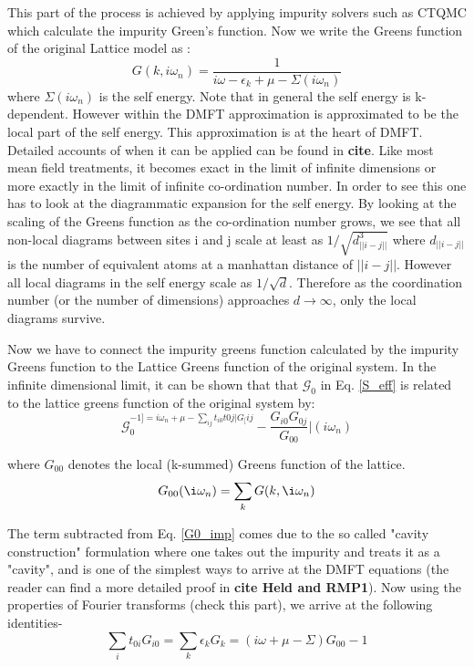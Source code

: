 \documentclass[12pt,letter]{article}
\begin{document}
This part of the process is achieved by applying impurity solvers such as CTQMC which calculate the impurity Green's function. Now we write the Greens function of the original Lattice model as :
\begin{equation}
G(k,i\omega_n)=\dfrac{1}{i\omega -\epsilon_k +\mu -\Sigma(i\omega_n)}
\end{equation}
 where $\Sigma(i\omega_n)$ is the self energy. Note that in general the self energy is k-dependent. However within the DMFT approximation is approximated to be the local part of the self energy. This approximation is at the heart of DMFT. Detailed accounts of when it can be applied can be found in \textbf{cite}. Like most mean field treatments, it becomes exact in the limit of infinite dimensions or more exactly in the limit of infinite co-ordination number. In order to see this one has to look at the diagrammatic expansion for the self energy. By looking at the scaling of the Greens function as the co-ordination number grows, we see that all non-local diagrams between sites i and j scale at least as $1/\sqrt{d_{||i-j||}^3}$ where $d_{||i-j||}$ is the number of equivalent atoms at a manhattan distance of $||i-j||$. However all local diagrams in the self energy scale as $1/\sqrt{d}$. Therefore as the coordination number (or the number of dimensions) approaches $d \rightarrow \infty$, only the local diagrams survive. 
 
 Now we have to connect the impurity greens function calculated by the impurity Greens function to the Lattice Greens function of the original system. In the infinite dimensional limit, it can be shown that that $\mathcal{G}_0$ in Eq. \ref{S_eff} is related to the lattice greens function of the original system by:
 \begin{equation}
  \mathcal{G}_0^{-1]= i\omega_n +\mu -\sum_{ij} t_{i0}t{0j}|G_[ij} -\dfrac{G_{i0}G_{0j}}{G_{00}}|(i \omega_n)
  \end{equation}
  
  where $G_{00}$ denotes the local (k-summed) Greens function of the lattice.
\begin{equation}
  G_{00}(\i\omega_n)=\sum_k G(k,\i\omega_n)
 \end{equation} 

  The term subtracted from Eq. \ref{G0_imp} comes due to the so called "cavity construction" formulation where one takes out the impurity and treats it as a "cavity", and is one of the simplest ways to arrive at the DMFT equations (the reader can find a more detailed proof in \textbf{cite Held and RMP1}). Now using the properties of Fourier transforms (check this part), we arrive at the following identities-
  \begin{equation}
  \sum_{i} t_{0i} G_{i0}= \sum_{k}\epsilon_k G_k= (i\omega +\mu -\Sigma)G_{00} -1
  \end{equation}
 
\end{document}
